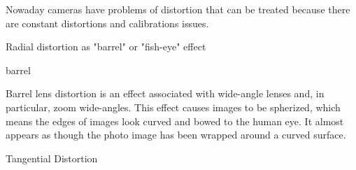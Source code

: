 Nowaday cameras have problems of distortion that can be treated because there are constant distortions and calibrations issues.

Radial distortion as "barrel" or "fish-eye" effect

barrel

Barrel lens distortion is an effect associated with wide-angle lenses and, in particular, zoom wide-angles. This effect causes images to be spherized, which means the edges of images look curved and bowed to the human eye. It almost appears as though the photo image has been wrapped around a curved surface.

Tangential Distortion

